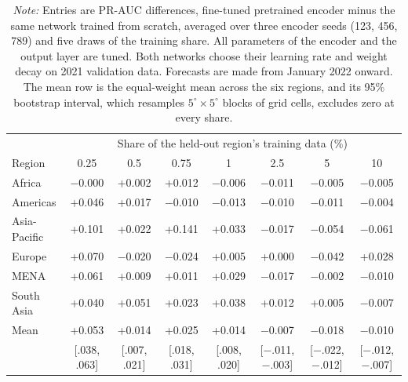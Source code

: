 \documentclass[11pt, letterpaper]{article}
\begin{document}
\begin{table}[!htbp]
\centering
\caption{Fine-Tuned Pretrained Encoder Versus the Same Network Trained From Scratch, All Parameters Tuned}
\label{tab:finetune_grid_full}
\small
\begin{tabular}{lccccccc}
\hline
 & \multicolumn{7}{c}{Share of the held-out region's training data (\%)} \\
Region & 0.25 & 0.5 & 0.75 & 1 & 2.5 & 5 & 10 \\
\hline
Africa & $-$0.000 & +0.002 & +0.012 & $-$0.006 & $-$0.011 & $-$0.005 & $-$0.005 \\
Americas & +0.046 & +0.017 & $-$0.010 & $-$0.013 & $-$0.010 & $-$0.011 & $-$0.004 \\
Asia-Pacific & +0.101 & +0.022 & +0.141 & +0.033 & $-$0.017 & $-$0.054 & $-$0.061 \\
Europe & +0.070 & $-$0.020 & $-$0.024 & +0.005 & +0.000 & $-$0.042 & +0.028 \\
MENA & +0.061 & +0.009 & +0.011 & +0.029 & $-$0.017 & $-$0.002 & $-$0.010 \\
South Asia & +0.040 & +0.051 & +0.023 & +0.038 & +0.012 & +0.005 & $-$0.007 \\
\hline
Mean & +0.053 & +0.014 & +0.025 & +0.014 & $-$0.007 & $-$0.018 & $-$0.010 \\
 & {\scriptsize [.038, .063]} & {\scriptsize [.007, .021]} & {\scriptsize [.018, .031]} & {\scriptsize [.008, .020]} & {\scriptsize [$-$.011, $-$.003]} & {\scriptsize [$-$.022, $-$.012]} & {\scriptsize [$-$.012, $-$.007]} \\
\hline
\end{tabular}
\caption*{\footnotesize \textit{Note:} Entries are PR-AUC differences, fine-tuned pretrained encoder minus the same network trained from scratch, averaged over three encoder seeds (123, 456, 789) and five draws of the training share. All parameters of the encoder and the output layer are tuned. Both networks choose their learning rate and weight decay on 2021 validation data. Forecasts are made from January 2022 onward. The mean row is the equal-weight mean across the six regions, and its 95\% bootstrap interval, which resamples $5^\circ \times 5^\circ$ blocks of grid cells, excludes zero at every share.}
\end{table}
\end{document}
